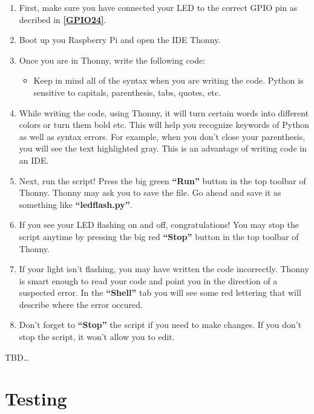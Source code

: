 \documentclass{article}\usepackage[]{graphicx}\usepackage[]{color}
\begin{document}
\begin{enumerate}
\item First, make sure you have connected your LED to the correct GPIO pin as decribed in \textbf{\ref{GPIO24}}.
\item Boot up you Raspberry Pi and open the IDE Thonny.
\item Once you are in Thonny, write the following code: \newline

\begin{itemize}
\item Keep in mind all of the syntax when you are writing the code. Python is sensitive to capitals, parenthesis, tabs, quotes, etc.
\end{itemize}
\item While writing the code, using Thonny, it will turn certain words into different colors or turn them bold etc. This will help you recognize keywords of Python as well as syntax errors. For example, when you don't close your parenthesis, you will see the text highlighted gray. This is an advantage of writing code in an IDE.
\item Next, run the script! Press the big green \textbf{``Run''} button in the top toolbar of Thonny. Thonny may ask you to save the file. Go ahead and save it as something like \textbf{``ledflash.py''}.
\item If you see your LED flashing on and off, congratulations! You may stop the script anytime by pressing the big red \textbf{``Stop''} button in the top toolbar of Thonny.
\item If your light isn't flashing, you may have written the code incorrectly. Thonny is smart enough to read your code and point you in the direction of a suspected error. In the \textbf{``Shell''} tab you will see some red lettering that will describe where the error occured.
\item Don't forget to \textbf{``Stop''} the script if you need to make changes. If you don't stop the script, it won't allow you to edit.
\end{enumerate}


TBD\ldots

\section{Testing}
\end{document}

